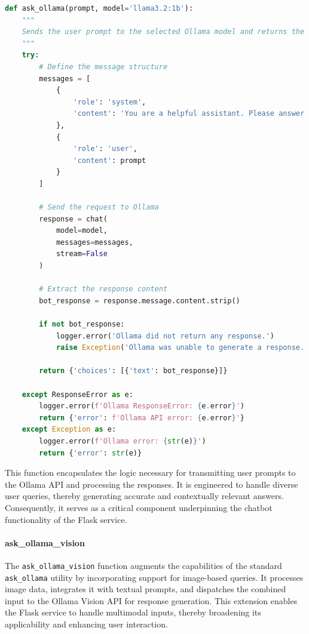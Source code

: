 \begin{lstlisting}[language=Python, caption={ask\_ollama Utility Function}]
def ask_ollama(prompt, model='llama3.2:1b'):
    """
    Sends the user prompt to the selected Ollama model and returns the response.
    """
    try:
        # Define the message structure
        messages = [
            {
                'role': 'system',
                'content': 'You are a helpful assistant. Please answer the following user query:'
            },
            {
                'role': 'user',
                'content': prompt
            }
        ]

        # Send the request to Ollama
        response = chat(
            model=model,
            messages=messages,
            stream=False
        )

        # Extract the response content
        bot_response = response.message.content.strip()

        if not bot_response:
            logger.error('Ollama did not return any response.')
            raise Exception('Ollama was unable to generate a response.')

        return {'choices': [{'text': bot_response}]}

    except ResponseError as e:
        logger.error(f'Ollama ResponseError: {e.error}')
        return {'error': f'Ollama API error: {e.error}'}
    except Exception as e:
        logger.error(f'Ollama error: {str(e)}')
        return {'error': str(e)}
\end{lstlisting}

This function encapsulates the logic necessary for transmitting user prompts to the Ollama API and processing the responses. It is engineered to handle diverse user queries, thereby generating accurate and contextually relevant answers. Consequently, it serves as a critical component underpinning the chatbot functionality of the Flask service.

\paragraph{ask\_ollama\_vision}

The \texttt{ask\_ollama\_vision} function augments the capabilities of the standard \texttt{ask\_ollama} utility by incorporating support for image-based queries. It processes image data, integrates it with textual prompts, and dispatches the combined input to the Ollama Vision API for response generation. This extension enables the Flask service to handle multimodal inputs, thereby broadening its applicability and enhancing user interaction.

